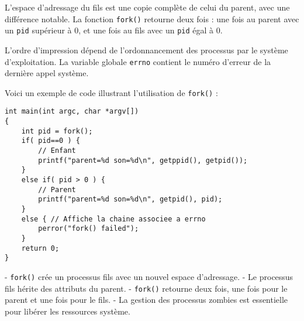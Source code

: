\documentclass[12pt]{article}
\begin{document}
L'espace d'adressage du fils est une copie complète de celui du parent, avec une différence notable. La fonction \texttt{fork()} retourne deux fois : une fois au parent avec un \texttt{pid} supérieur à 0, et une fois au fils avec un \texttt{pid} égal à 0.

\begin{tcolorbox}[title={Intuition}]
L'ordre d'impression dépend de l'ordonnancement des processus par le système d'exploitation. La variable globale \texttt{errno} contient le numéro d'erreur de la dernière appel système.
\end{tcolorbox}

Voici un exemple de code illustrant l'utilisation de \texttt{fork()} :

\begin{lstlisting}
int main(int argc, char *argv[])
{
    int pid = fork();
    if( pid==0 ) {
        // Enfant
        printf("parent=%d son=%d\n", getppid(), getpid());
    }
    else if( pid > 0 ) {
        // Parent
        printf("parent=%d son=%d\n", getpid(), pid);
    }
    else { // Affiche la chaine associee a errno
        perror("fork() failed");
    }
    return 0;
}
\end{lstlisting}

\begin{tcolorbox}[title={Fiche Récapitulative}]
- \texttt{fork()} crée un processus fils avec un nouvel espace d'adressage.
- Le processus fils hérite des attributs du parent.
- \texttt{fork()} retourne deux fois, une fois pour le parent et une fois pour le fils.
- La gestion des processus zombies est essentielle pour libérer les ressources système.
\end{tcolorbox}
\end{document}
